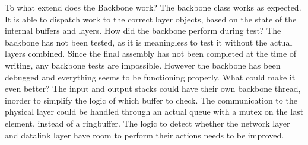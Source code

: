 To what extend does the Backbone work? 
The backbone class works as expected. It is able to dispatch work to the correct layer objects, based on the state of the internal buffers and layers.
How did the backbone perform during test?
The backbone has not been tested, as it is meaningless to test it without the actual layers combined. Since the final assembly has not been completed at the time of writing, any backbone tests are impossible. However the backbone has been debugged and everything seems to be functioning properly.
What could make it even better?
The input and output stacks could have their own backbone thread, inorder to simplify the logic of which buffer to check.
The communication to the physical layer could be handled through an actual queue with a mutex on the last element, instead of a ringbuffer. The logic to detect whether the network layer and datalink layer have room to perform their actions needs to be improved.


